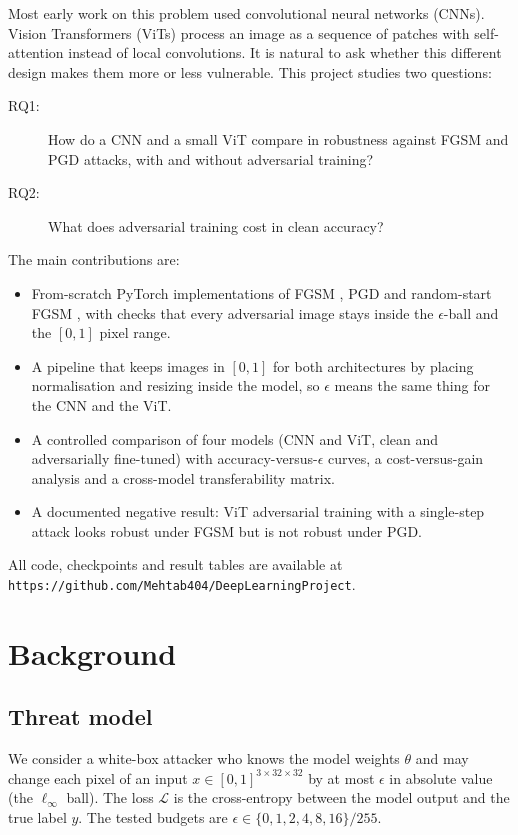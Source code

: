 \documentclass[a4paper,11pt]{article}
\begin{document}
Most early work on this problem used convolutional neural networks
(CNNs). Vision Transformers (ViTs) \cite{Dosovitskiy:21} process an image
as a sequence of patches with self-attention instead of local
convolutions. It is natural to ask whether this different design makes
them more or less vulnerable. This project studies two questions:

\begin{description}
\item[RQ1:] How do a CNN and a small ViT compare in robustness against
FGSM and PGD attacks, with and without adversarial training?
\item[RQ2:] What does adversarial training cost in clean accuracy?
\end{description}

The main contributions are:

\begin{itemize}
\item From-scratch PyTorch implementations of FGSM \cite{Goodfellow:15},
PGD \cite{Madry:18} and random-start FGSM \cite{Wong:20}, with checks that
every adversarial image stays inside the $\epsilon$-ball and the $[0,1]$
pixel range.
\item A pipeline that keeps images in $[0,1]$ for both architectures by
placing normalisation and resizing inside the model, so $\epsilon$ means
the same thing for the CNN and the ViT.
\item A controlled comparison of four models (CNN and ViT, clean and
adversarially fine-tuned) with accuracy-versus-$\epsilon$ curves, a
cost-versus-gain analysis and a cross-model transferability matrix.
\item A documented negative result: ViT adversarial training with a
single-step attack looks robust under FGSM but is not robust under PGD.
\end{itemize}

All code, checkpoints and result tables are available at
\texttt{https://github.com/Mehtab404/DeepLearningProject}.

\section{Background}

\subsection{Threat model}

We consider a white-box attacker who knows the model weights $\theta$ and
may change each pixel of an input $x \in [0,1]^{3 \times 32 \times 32}$
by at most $\epsilon$ in absolute value (the $\ell_\infty$ ball). The loss
$\mathcal{L}$ is the cross-entropy between the model output and the true
label $y$. The tested budgets are
$\epsilon \in \{0, 1, 2, 4, 8, 16\}/255$.
\end{document}
